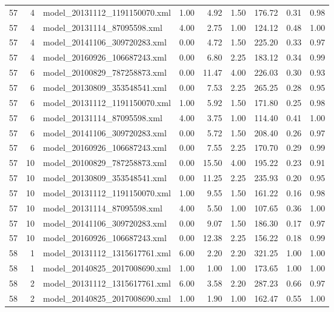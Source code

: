 \begin{table}[ht]
\begin{tabular}{rrlrrrrrr}
   57 &   4 & model\_20131112\_1191150070.xml & 1.00 & 4.92 & 1.50 & 176.72 & 0.31 & 0.98 \\ 
   57 &   4 & model\_20131114\_87095598.xml & 4.00 & 2.75 & 1.00 & 124.12 & 0.48 & 1.00 \\ 
   57 &   4 & model\_20141106\_309720283.xml & 0.00 & 4.72 & 1.50 & 225.20 & 0.33 & 0.97 \\ 
   57 &   4 & model\_20160926\_106687243.xml & 0.00 & 6.80 & 2.25 & 183.12 & 0.34 & 0.99 \\ 
   57 &   6 & model\_20100829\_787258873.xml & 0.00 & 11.47 & 4.00 & 226.03 & 0.30 & 0.93 \\ 
   57 &   6 & model\_20130809\_353548541.xml & 0.00 & 7.53 & 2.25 & 265.25 & 0.28 & 0.95 \\ 
   57 &   6 & model\_20131112\_1191150070.xml & 1.00 & 5.92 & 1.50 & 171.80 & 0.25 & 0.98 \\ 
   57 &   6 & model\_20131114\_87095598.xml & 4.00 & 3.75 & 1.00 & 114.40 & 0.41 & 1.00 \\ 
   57 &   6 & model\_20141106\_309720283.xml & 0.00 & 5.72 & 1.50 & 208.40 & 0.26 & 0.97 \\ 
   57 &   6 & model\_20160926\_106687243.xml & 0.00 & 7.55 & 2.25 & 170.70 & 0.29 & 0.99 \\ 
   57 &  10 & model\_20100829\_787258873.xml & 0.00 & 15.50 & 4.00 & 195.22 & 0.23 & 0.91 \\ 
   57 &  10 & model\_20130809\_353548541.xml & 0.00 & 11.25 & 2.25 & 235.93 & 0.20 & 0.95 \\ 
   57 &  10 & model\_20131112\_1191150070.xml & 1.00 & 9.55 & 1.50 & 161.22 & 0.16 & 0.98 \\ 
   57 &  10 & model\_20131114\_87095598.xml & 4.00 & 5.50 & 1.00 & 107.65 & 0.36 & 1.00 \\ 
   57 &  10 & model\_20141106\_309720283.xml & 0.00 & 9.07 & 1.50 & 186.30 & 0.17 & 0.97 \\ 
   57 &  10 & model\_20160926\_106687243.xml & 0.00 & 12.38 & 2.25 & 156.22 & 0.18 & 0.99 \\ 
   58 &   1 & model\_20131112\_1315617761.xml & 6.00 & 2.20 & 2.20 & 321.25 & 1.00 & 1.00 \\ 
   58 &   1 & model\_20140825\_2017008690.xml & 1.00 & 1.00 & 1.00 & 173.65 & 1.00 & 1.00 \\ 
   58 &   2 & model\_20131112\_1315617761.xml & 6.00 & 3.58 & 2.20 & 287.23 & 0.66 & 0.97 \\ 
   58 &   2 & model\_20140825\_2017008690.xml & 1.00 & 1.90 & 1.00 & 162.47 & 0.55 & 1.00 \\ 

\end{tabular}
\end{table}
